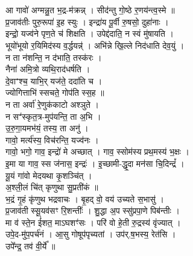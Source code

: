 \section{}
आ गावो॑ अग्मन्नु॒त भ॒द्र-म॑क्रन्न् । सीद॑न्तु गो॒ष्ठे र॒णय॑न्त्व॒स्मे ॥\\
प्र॒जाव॑तीः पुरु॒रूपा॑ इ॒ह स्युः । इन्द्रा॑य पू॒र्वी रु॒षसो॒ दुहा॑नाः ।\\
इन्द्रो॒ यज्व॑ने पृण॒ते च॑ शिक्षति । उपेद्द॑दाति॒ न स्वं मु॑षायति ।\\
भूयो॑भूयो र॒यिमिद॑स्य व॒र्द्धयन्न्॑ । अभि॑न्ने खि॒ल्ले निद॑धाति देव॒युं ।\\
न ता न॑शन्ति॒ न द॑भाति॒ तस्क॑रः ।\\
नैना॑ अमि॒त्रो व्यथि॒राद॑धर्षति ।\\
दे॒वाꣲश्च॒ याभि॒र् यज॑ते॒ ददा॑ति च ।\\
ज्योगित्ताभि॑ स्सचते॒ गोप॑ति स्स॒ह ॥\\
न ता अर्वा॑ रे॒णुक॑काटो अश्ञुते ।\\
न सꣲ॑स्कृत॒त्र-मुप॑यन्ति॒ ता अ॒भि ।\\
उ॒रु॒गा॒यमभ॑यं॒ तस्य॒ ता अनु॑ ।\\
गावो॒ मर्त्य॑स्य॒ विच॑रन्ति॒ यज्व॑नः ।\\
गावो॒ भगो॒ गाव॒ इन्द्रो॑ मे अच्छात् । गाव॒ स्सोम॑स्य प्रथ॒मस्य॑ भ॒क्षः ।\\
इ॒मा या गाव॒ स्स ज॑नास॒ इन्द्रः॑ । इ॒च्छामी-द्धृ॒दा मन॑सा चि॒दिन्द्रं᳚ ।\\
यू॒यं गा॑वो मेदयथा कृ॒शञ्चि॑त् ।\\
अ॒श्ली॒लं चि॑त् कृणुथा सु॒प्रती॑कं ॥\\
भ॒द्रं गृ॒हं कृ॑णुथ भद्रवाचः । बृ॒हद् वो॒ वय॑ उच्यते स॒भासु॑ ।\\
प्र॒जाव॑ती स्सू॒यव॑सꣳ रि॒शन्तीः᳚ । शु॒द्धा अ॒प स्सु॑प्रपा॒णे पिब॑न्तीः ।\\
मा व॑ स्ते॒न ई॑शत॒ माऽघशꣳ॑सः । परि॑ वो हे॒ती रु॒द्रस्य॑ वृंज्यात् ।\\
उपे॒द-मु॑प॒पर्च॑नं । आ॒सु गोषूप॑पृच्यतां । उप॑र्.ष॒भस्य॒ रेत॑सि ।\\
उपे᳚न्द्र॒ तव॑ वी॒र्ये᳚ ॥\\
